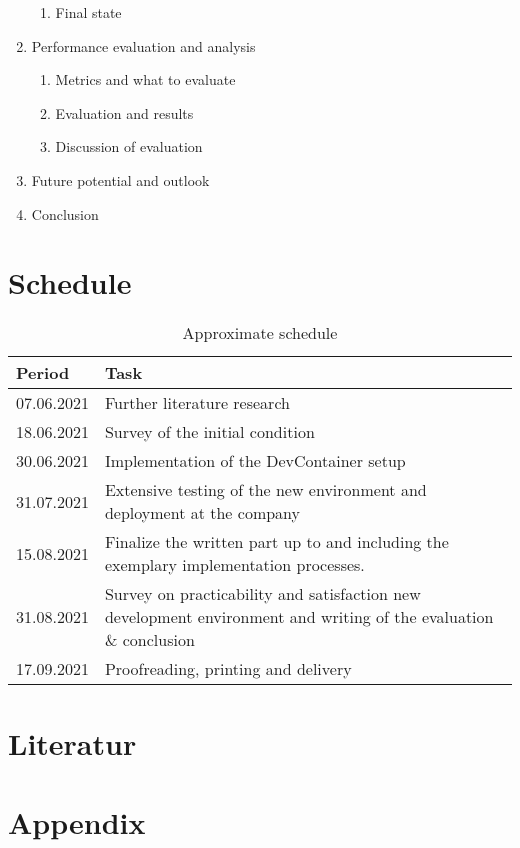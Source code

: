 \documentclass[12pt, a4paper]{article}
\begin{document}
\begin{enumerate}
\begin{enumerate}
        \item Final state
    \end{enumerate}
    \item Performance evaluation and analysis
    \begin{enumerate}
        \item Metrics and what to evaluate
        \item Evaluation and results
        \item Discussion of evaluation
    \end{enumerate}
    \item Future potential and outlook
    \item Conclusion
\end{enumerate}

\section{Schedule}
\begin{table}[H]
    \centering
    \begin{tabular}{ l p{14cm} }
    \hline
    Period & Task \\ \hline\hline
    07.06.2021 & Further literature research\\ \hline
    18.06.2021 & Survey of the initial condition\\ \hline
    30.06.2021 & Implementation of the DevContainer setup\\ \hline
    31.07.2021 & Extensive testing of the new environment and deployment at the company\\ \hline
    15.08.2021 & Finalize the written part up to and including the exemplary implementation processes.\\ \hline
    31.08.2021 & Survey on practicability and satisfaction new development environment and writing of the evaluation \& conclusion \\ \hline
    17.09.2021 & Proofreading, printing and delivery\\ \hline
    \end{tabular}
    \caption{Approximate schedule}
    \label{tab::time}
    \end{table}
\section{Literatur}


\newpage

\renewcommand{\thesubsection}{\Alph{subsection}}
\setcounter{page}{\value{lastroman}}
\section*{Appendix}


\end{document}
